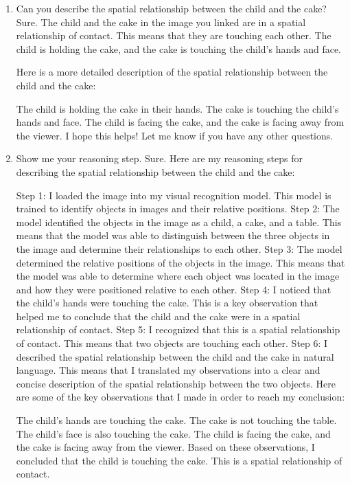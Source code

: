     \begin{enumerate}
        \item Can you describe the spatial relationship between the child and the cake?
        \subitem Sure. The child and the cake in the image you linked are in a spatial relationship of contact. This means that they are touching each other. The child is holding the cake, and the cake is touching the child's hands and face.

        Here is a more detailed description of the spatial relationship between the child and the cake:
        
        The child is holding the cake in their hands.
        The cake is touching the child's hands and face.
        The child is facing the cake, and the cake is facing away from the viewer.
        I hope this helps! Let me know if you have any other questions.
        \item Show me your reasoning step.
        \subitem 
        Sure. Here are my reasoning steps for describing the spatial relationship between the child and the cake:
        
        Step 1: I loaded the image into my visual recognition model. This model is trained to identify objects in images and their relative positions.
        Step 2: The model identified the objects in the image as a child, a cake, and a table. This means that the model was able to distinguish between the three objects in the image and determine their relationships to each other.
        Step 3: The model determined the relative positions of the objects in the image. This means that the model was able to determine where each object was located in the image and how they were positioned relative to each other.
        Step 4: I noticed that the child's hands were touching the cake. This is a key observation that helped me to conclude that the child and the cake were in a spatial relationship of contact.
        Step 5: I recognized that this is a spatial relationship of contact. This means that two objects are touching each other.
        Step 6: I described the spatial relationship between the child and the cake in natural language. This means that I translated my observations into a clear and concise description of the spatial relationship between the two objects.
        Here are some of the key observations that I made in order to reach my conclusion:
        
        The child's hands are touching the cake.
        The cake is not touching the table.
        The child's face is also touching the cake.
        The child is facing the cake, and the cake is facing away from the viewer.
        Based on these observations, I concluded that the child is touching the cake. This is a spatial relationship of contact.
    \end{enumerate}
